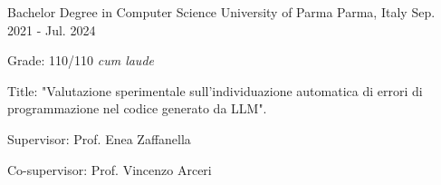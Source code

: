 

\begin{cventries}

  \cventry
    {Bachelor Degree in Computer Science} %
    {University of Parma} %
    {Parma, Italy} %
    {Sep. 2021 - Jul. 2024} %
    {
			\begin{cvitems-no-bullet} %
				\item {Grade: 110/110 \emph{cum laude}}
				\item {Title: "Valutazione sperimentale sull’individuazione automatica di errori di programmazione nel codice generato da LLM".}
				\item {Supervisor: Prof. Enea Zaffanella}
				\item {Co-supervisor: Prof. Vincenzo Arceri}
      \end{cvitems-no-bullet}
    }

\end{cventries}
